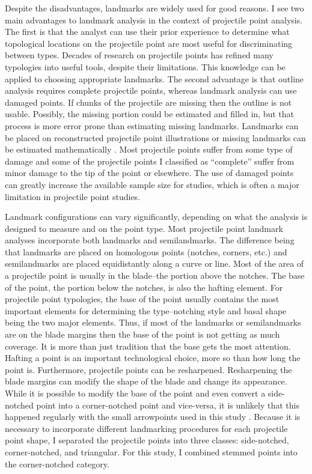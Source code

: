 \documentclass[a4paper]{article}
\begin{document}
Despite the disadvantages, landmarks are widely used for good reasons. I see two main advantages to landmark analysis in the context of projectile point analysis. The first is that the analyst can use their prior experience to determine what topological locations on the projectile point are most useful for discriminating between types. Decades of research on projectile points has refined many typologies into useful tools, despite their limitations. This knowledge can be applied to choosing appropriate landmarks. The second advantage is that outline analysis requires complete projectile points, whereas landmark analysis can use damaged points. If chunks of the projectile are missing then the outline is not usable. Possibly, the missing portion could be estimated and filled in, but that process is more error prone than estimating missing landmarks. Landmarks can be placed on reconstructed projectile point illustrations or missing landmarks can be estimated mathematically \autocite{Gunz2009-yb}. Most projectile points suffer from some type of damage and some of the projectile points I classified as ``complete'' suffer from minor damage to the tip of the point or elsewhere. The use of damaged points can greatly increase the available sample size for studies, which is often a major limitation in projectile point studies.

Landmark configurations can vary significantly, depending on what the analysis is designed to measure and on the point type. Most projectile point landmark analyses incorporate both landmarks and semilandmarks. The difference being that landmarks are placed on homologous points (notches, corners, etc.) and semilandmarks are placed equidistantly along a curve or line. Most of the area of a projectile point is usually in the blade--the portion above the notches. The base of the point, the portion below the notches, is also the hafting element. For projectile point typologies, the base of the point usually contains the most important elements for determining the type--notching style and basal shape being the two major elements. Thus, if most of the landmarks or semilandmarks are on the blade margins then the base of the point is not getting as much coverage. It is more than just tradition that the base gets the most attention. Hafting a point is an important technological choice, more so than how long the point is. Furthermore, projectile points can be resharpened. Resharpening the blade margins can modify the shape of the blade and change its appearance. While it is possible to modify the base of the point and even convert a side-notched point into a corner-notched point and vice-versa, it is unlikely that this happened regularly with the small arrowpoints used in this study \autocite{Loendorf2019-df}. Because it is necessary to incorporate different landmarking procedures for each projectile point shape, I separated the projectile points into three classes: side-notched, corner-notched, and triangular. For this study, I combined stemmed points into the corner-notched category.
\end{document}
